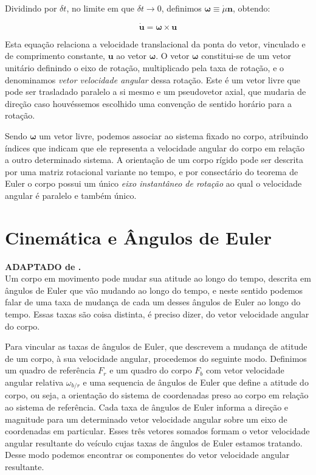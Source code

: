 Dividindo por \(\delta t\), no limite em que \(\delta t \rightarrow 0\), definimos \(\mathbf{\omega} \equiv \dot{\mu}\mathbf{n}\), obtendo:

\begin{equation*}
    \dot{\mathbf{u}} = \mathbf{\omega}\!\times\!\mathbf{u}\tag{1.4-1}
\end{equation*}

Esta equação relaciona a velocidade translacional da ponta do vetor, vinculado e de comprimento constante, \(\mathbf{u}\) ao vetor \(\mathbf{\omega}\). O vetor \(\mathbf{\omega}\) constitui-se de um vetor unitário definindo o eixo de rotação, multiplicado pela taxa de rotação, e o denominamos \textit{vetor velocidade angular} dessa rotação. Este é um vetor livre que pode ser trasladado paralelo a si mesmo e um pseudovetor axial, que mudaria de direção caso houvéssemos escolhido uma convenção de sentido horário para a rotação.

Sendo \(\mathbf{\omega}\) um vetor livre, podemos associar ao sistema fixado no corpo, atribuindo índices que indicam que ele representa a velocidade angular do corpo em relação a outro determinado sistema. A orientação de um corpo rígido pode ser descrita por uma matriz rotacional variante no tempo, e por consectário do teorema de Euler o corpo possui um único \emph{eixo instantâneo de rotação} ao qual o velocidade angular é paralelo e também único.

\section{Cinemática e Ângulos de Euler}

\textbf{ADAPTADO de .}
\\

Um corpo em movimento pode mudar sua atitude ao longo do tempo, descrita em ângulos de Euler que vão mudando ao longo do tempo, e neste sentido podemos falar de uma taxa de mudança de cada um desses ângulos de Euler ao longo do tempo. Essas taxas são coisa distinta, é preciso dizer, do vetor velocidade angular do corpo.

Para vincular as taxas de ângulos de Euler, que descrevem a mudança de atitude de um corpo, à sua velocidade angular, procedemos do seguinte modo. Definimos um quadro de referência \(F_{r}\) e um quadro do corpo \(F_{b}\) com vetor velocidade angular relativa \(\omega_{b/r}\) e uma sequencia de ângulos de Euler que define a atitude do corpo, ou seja, a orientação do sistema de coordenadas preso ao corpo em relação ao sistema de referência. Cada taxa de ângulos de Euler informa a direção e magnitude para um determinado vetor velocidade angular sobre um eixo de coordenadas em particular. Esses três vetores somados formam o vetor velocidade angular resultante do veículo cujas taxas de ângulos de Euler estamos tratando. Desse modo podemos encontrar os componentes do vetor velocidade angular resultante.

